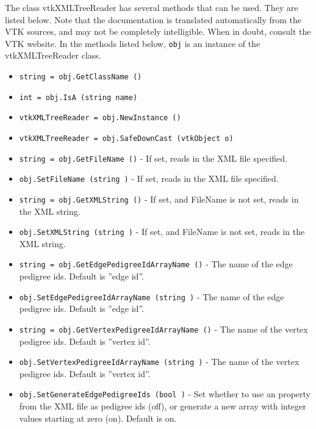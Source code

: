 The class vtkXMLTreeReader has several methods that can be used.
  They are listed below.
Note that the documentation is translated automatically from the VTK sources,
and may not be completely intelligible.  When in doubt, consult the VTK website.
In the methods listed below, \verb|obj| is an instance of the vtkXMLTreeReader class.
\begin{itemize}
\item  \verb|string = obj.GetClassName ()|

\item  \verb|int = obj.IsA (string name)|

\item  \verb|vtkXMLTreeReader = obj.NewInstance ()|

\item  \verb|vtkXMLTreeReader = obj.SafeDownCast (vtkObject o)|

\item  \verb|string = obj.GetFileName ()| -  If set, reads in the XML file specified.

\item  \verb|obj.SetFileName (string )| -  If set, reads in the XML file specified.

\item  \verb|string = obj.GetXMLString ()| -  If set, and FileName is not set, reads in the XML string.

\item  \verb|obj.SetXMLString (string )| -  If set, and FileName is not set, reads in the XML string.

\item  \verb|string = obj.GetEdgePedigreeIdArrayName ()| -  The name of the edge pedigree ids. Default is ''edge id''.

\item  \verb|obj.SetEdgePedigreeIdArrayName (string )| -  The name of the edge pedigree ids. Default is ''edge id''.

\item  \verb|string = obj.GetVertexPedigreeIdArrayName ()| -  The name of the vertex pedigree ids. Default is ''vertex id''.

\item  \verb|obj.SetVertexPedigreeIdArrayName (string )| -  The name of the vertex pedigree ids. Default is ''vertex id''.

\item  \verb|obj.SetGenerateEdgePedigreeIds (bool )| -  Set whether to use an property from the XML file as pedigree ids (off),
 or generate a new array with integer values starting at zero (on).
 Default is on.


\end{itemize}
